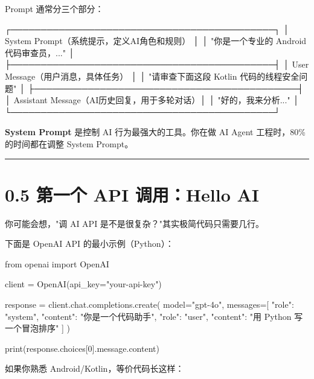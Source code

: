 Prompt 通常分三个部分：


\begin{codeblock}
┌────────────────────────────────────────────┐
│ System Prompt（系统提示，定义AI角色和规则）  │
│ "你是一个专业的 Android 代码审查员，..."     │
├────────────────────────────────────────────┤
│ User Message（用户消息，具体任务）           │
│ "请审查下面这段 Kotlin 代码的线程安全问题"   │
├────────────────────────────────────────────┤
│ Assistant Message（AI历史回复，用于多轮对话）│
│ "好的，我来分析..."                          │
└────────────────────────────────────────────┘
\end{codeblock}

\textbf{System Prompt} 是控制 AI 行为最强大的工具。你在做 AI Agent 工程时，80\% 的时间都在调整 System Prompt。


\bigskip\hrule\bigskip

\section{0.5 第一个 API 调用：Hello AI}

你可能会想，"调 AI API 是不是很复杂？"其实极简代码只需要几行。


下面是 OpenAI API 的最小示例（Python）：


\begin{codeblock}
from openai import OpenAI

client = OpenAI(api_key="your-api-key")

response = client.chat.completions.create(
    model="gpt-4o",
    messages=[
        {"role": "system", "content": "你是一个代码助手"},
        {"role": "user", "content": "用 Python 写一个冒泡排序"}
    ]
)

print(response.choices[0].message.content)
\end{codeblock}

如果你熟悉 Android/Kotlin，等价代码长这样：



